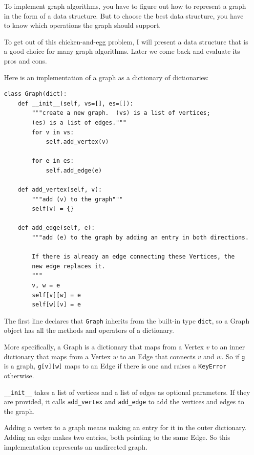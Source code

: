 \documentclass[10pt]{book}
\begin{document}
To implement graph algorithms, you have to figure
out how to represent a graph in the form of a data structure.
But to choose the best data structure, you have to know which
operations the graph should support.

To get out of this chicken-and-egg problem, I will present
a data structure that is a good choice for many graph algorithms.
Later we come back and evaluate its pros and cons.

Here is an implementation of a graph as a dictionary of dictionaries:
%
\begin{verbatim}
class Graph(dict):
    def __init__(self, vs=[], es=[]):
        """create a new graph.  (vs) is a list of vertices;
        (es) is a list of edges."""
        for v in vs:
            self.add_vertex(v)

        for e in es:
            self.add_edge(e)

    def add_vertex(self, v):
        """add (v) to the graph"""
        self[v] = {}

    def add_edge(self, e):
        """add (e) to the graph by adding an entry in both directions.

        If there is already an edge connecting these Vertices, the
        new edge replaces it.
        """
        v, w = e
        self[v][w] = e
        self[w][v] = e
\end{verbatim}
%
The first line declares that {\tt Graph} inherits from the built-in
type {\tt dict}, so a Graph object has all the methods and operators
of a dictionary.

More specifically, a Graph is a dictionary that maps from
a Vertex $v$ to an inner dictionary that maps from a Vertex $w$
to an Edge that connects $v$ and $w$.  So if {\tt g} is a graph,
{\tt g[v][w]} maps to an Edge if there is one and raises
a {\tt KeyError} otherwise.

\verb"__init__" takes a list of vertices and a list of
edges as optional parameters.  If they are provided, it calls
\verb"add_vertex" and \verb"add_edge" to add the vertices and edges to
the graph.

Adding a vertex to a graph means making an entry for it in the
outer dictionary.  Adding an edge makes two entries, both pointing
to the same Edge.  So this implementation represents an undirected
graph.
\end{document}

